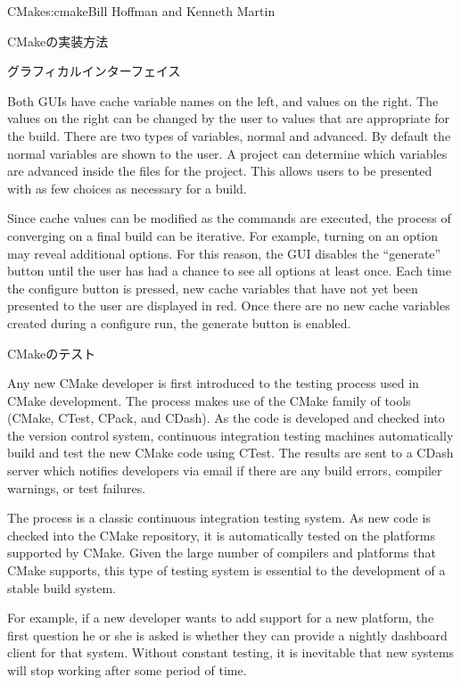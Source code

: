 \begin{aosachapter}{CMake}{s:cmake}{Bill Hoffman and Kenneth Martin}
\begin{aosasect1}{CMakeの実装方法}
\begin{aosasect2}{グラフィカルインターフェイス}


Both GUIs have cache variable names on the left, and values on the
right. The values on the right can be changed by the user to values
that are appropriate for the build. There are two types of
variables, normal and advanced. By default the normal variables are
shown to the user. A project can determine which variables are
advanced inside the  files for the project. This
allows users to be presented with as few choices as necessary for a
build.

Since cache values can be modified as the commands are executed, the
process of converging on a final build can be iterative. For example,
turning on an option may reveal additional options. For this reason,
the GUI disables the ``generate'' button until the user has had a
chance to see all options at least once. Each time the configure
button is pressed, new cache variables that have not yet been
presented to the user are displayed in red. Once there are
no new cache variables created during a configure run, the generate
button is enabled.

\end{aosasect2}

\begin{aosasect2}{CMakeのテスト}

Any new CMake developer is first introduced to the testing process
used in CMake development. The process makes use of the CMake family
of tools (CMake, CTest, CPack, and CDash).  As the code is developed
and checked into the version control system, continuous integration
testing machines automatically build and test the new CMake code using
CTest. The results are sent to a CDash server which notifies
developers via email if there are any build errors, compiler warnings,
or test failures.

The process is a classic continuous integration testing system. As new
code is checked into the CMake repository, it is automatically tested
on the platforms supported by CMake. Given the large number of
compilers and platforms that CMake supports, this type of testing
system is essential to the development of a stable build system.

For example, if a new developer wants to add support for a new
platform, the first question he or she is asked is whether they can
provide a nightly dashboard client for that system. Without constant
testing, it is inevitable that new systems will stop working after
some period of time.


\end{aosasect2}
\end{aosasect1}
\end{aosachapter}
